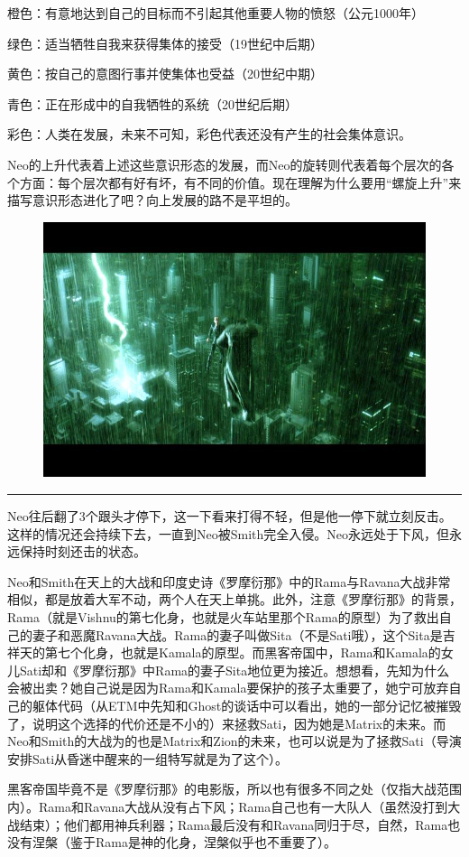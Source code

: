 \documentclass[UTF8]{ctexart}
\newcommand{\myparsep}{\noindent \rule[0.5ex]{\linewidth}{1pt}}
\begin{document}
橙色：有意地达到自己的目标而不引起其他重要人物的愤怒（公元1000年）

绿色：适当牺牲自我来获得集体的接受（19世纪中后期）

黄色：按自己的意图行事并使集体也受益（20世纪中期）

青色：正在形成中的自我牺牲的系统（20世纪后期）

彩色：人类在发展，未来不可知，彩色代表还没有产生的社会集体意识。

Neo的上升代表着上述这些意识形态的发展，而Neo的旋转则代表着每个层次的各个方面：每个层次都有好有坏，有不同的价值。现在理解为什么要用“螺旋上升”来描写意识形态进化了吧？向上发展的路不是平坦的。

\begin{figure}[htb]
\centering
\includegraphics[width=0.5\linewidth]{fig/b45db90ebee77ae436d12215.jpg}
\end{figure}

\myparsep

Neo往后翻了3个跟头才停下，这一下看来打得不轻，但是他一停下就立刻反击。这样的情况还会持续下去，一直到Neo被Smith完全入侵。Neo永远处于下风，但永远保持时刻还击的状态。

Neo和Smith在天上的大战和印度史诗《罗摩衍那》中的Rama与Ravana大战非常相似，都是放着大军不动，两个人在天上单挑。此外，注意《罗摩衍那》的背景，Rama（就是Vishnu的第七化身，也就是火车站里那个Rama的原型）为了救出自己的妻子和恶魔Ravana大战。Rama的妻子叫做Sita（不是Sati哦），这个Sita是吉祥天的第七个化身，也就是Kamala的原型。而黑客帝国中，Rama和Kamala的女儿Sati却和《罗摩衍那》中Rama的妻子Sita地位更为接近。想想看，先知为什么会被出卖？她自己说是因为Rama和Kamala要保护的孩子太重要了，她宁可放弃自己的躯体代码（从ETM中先知和Ghost的谈话中可以看出，她的一部分记忆被摧毁了，说明这个选择的代价还是不小的）来拯救Sati，因为她是Matrix的未来。而Neo和Smith的大战为的也是Matrix和Zion的未来，也可以说是为了拯救Sati（导演安排Sati从昏迷中醒来的一组特写就是为了这个）。

黑客帝国毕竟不是《罗摩衍那》的电影版，所以也有很多不同之处（仅指大战范围内）。Rama和Ravana大战从没有占下风；Rama自己也有一大队人（虽然没打到大战结束）；他们都用神兵利器；Rama最后没有和Ravana同归于尽，自然，Rama也没有涅槃（鉴于Rama是神的化身，涅槃似乎也不重要了）。
\end{document}
